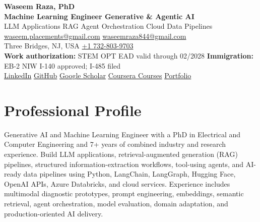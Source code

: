 \documentclass[9pt,letterpaper]{extarticle}
\begin{document}
\begin{center}
{\LARGE\bfseries Waseem Raza, PhD}{\normalsize\mdseries }\\[2pt]
{\large\bfseries Machine Learning Engineer \textbar{} Generative \& Agentic AI}\\[1pt]
{\small LLM Applications \textbar{} RAG \textbar{} Agent Orchestration \textbar{} Cloud Data Pipelines}\\[3pt]
{\footnotesize {}\enspace \href{mailto:waseem.placements@gmail.com}{waseem.placements@gmail.com} \textbar{} \href{mailto:waseemraza844@gmail.com}{waseemraza844@gmail.com}\\[1pt]Three Bridges, NJ, USA \quad {}\enspace \href{tel:+17328039703}{+1 732-803-9703}\\[1pt]{\scriptsize \textbf{Work authorization:} STEM OPT EAD valid through 02/2028 \textbar{} \textbf{Immigration:} EB-2 NIW I-140 approved; I-485 filed}\\[1pt]\href{https://www.linkedin.com/in/waseem-raza-phd-9a737858/}{LinkedIn} \textbar{} \href{https://github.com/WaseemRaza844}{GitHub} \textbar{} \href{https://scholar.google.com/citations?user=d58Drr0AAAAJ\&hl=en}{Google Scholar} \textbar{} \href{https://waseemraza844.github.io/portfolio/learning.html}{Coursera Courses} \textbar{} \href{https://waseemraza844.github.io/portfolio/}{Portfolio}}
\end{center}
\vspace{-5pt}
\section{Professional Profile}
Generative AI and Machine Learning Engineer with a PhD in Electrical and Computer Engineering and 7+ years of combined industry and research experience. Build LLM applications, retrieval-augmented generation (RAG) pipelines, structured information-extraction workflows, tool-using agents, and AI-ready data pipelines using Python, LangChain, LangGraph, Hugging Face, OpenAI APIs, Azure Databricks, and cloud services. Experience includes multimodal diagnostic prototypes, prompt engineering, embeddings, semantic retrieval, agent orchestration, model evaluation, domain adaptation, and production-oriented AI delivery.
\end{document}
